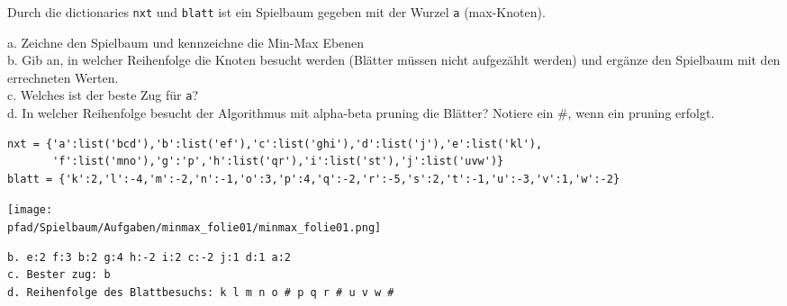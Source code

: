 \question[6]
Durch die dictionaries \texttt{nxt} und \texttt{blatt} ist ein Spielbaum
 gegeben mit der Wurzel \texttt{a} (max-Knoten).

a. Zeichne den Spielbaum und kennzeichne die Min-Max Ebenen \\
b. Gib an, in welcher Reihenfolge die Knoten besucht werden (Blätter müssen nicht aufgezählt werden)
 und ergänze den Spielbaum mit den errechneten Werten. \\
c. Welches ist der beste Zug für \texttt{a}? \\
d. In welcher Reihenfolge besucht der Algorithmus mit alpha-beta pruning die Blätter? Notiere ein \#, wenn
ein pruning erfolgt.

\begin{lstlisting}
nxt = {'a':list('bcd'),'b':list('ef'),'c':list('ghi'),'d':list('j'),'e':list('kl'),
       'f':list('mno'),'g':'p','h':list('qr'),'i':list('st'),'j':list('uvw')}
blatt = {'k':2,'l':-4,'m':-2,'n':-1,'o':3,'p':4,'q':-2,'r':-5,'s':2,'t':-1,'u':-3,'v':1,'w':-2}
\end{lstlisting}
\begin{solutionbox}{10cm}
\texttt{[image: \\pfad/Spielbaum/Aufgaben/minmax\_folie01/minmax\_folie01.png]}
\begin{lstlisting}
b. e:2 f:3 b:2 g:4 h:-2 i:2 c:-2 j:1 d:1 a:2
c. Bester zug: b
d. Reihenfolge des Blattbesuchs: k l m n o # p q r # u v w #
\end{lstlisting}
\end{solutionbox}
